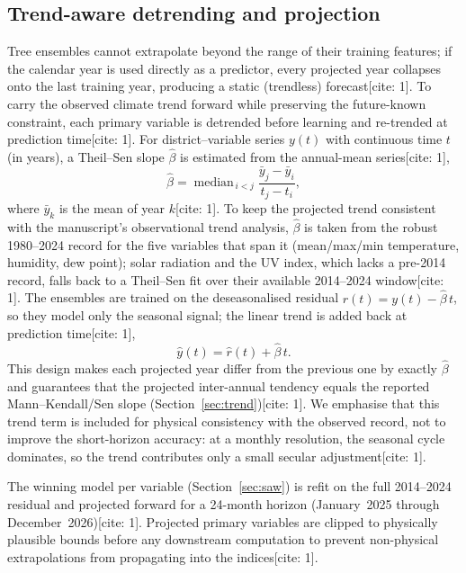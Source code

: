 \documentclass[pdflatex,sn-mathphys-ay]{sn-jnl}
\begin{document}
\subsection{Trend-aware detrending and projection}\label{sec:detrend}
Tree ensembles cannot extrapolate beyond the range of their training features; if the calendar year is used directly as a predictor, every projected year collapses onto the last training year, producing a static (trendless) forecast[cite: 1]. To carry the observed climate trend forward while preserving the future-known constraint, each primary variable is detrended before learning and re-trended at prediction time[cite: 1]. For district--variable series $y(t)$ with continuous time $t$ (in years), a Theil--Sen slope $\hat{\beta}$ is estimated from the annual-mean series[cite: 1],
\begin{equation}
\hat{\beta}=\operatorname{median}_{\,i<j}
\frac{\bar{y}_{j}-\bar{y}_{i}}{t_{j}-t_{i}},
\label{eq:theilsen}
\end{equation}
where $\bar{y}_{k}$ is the mean of year $k$[cite: 1]. To keep the projected trend consistent with the manuscript's observational trend analysis, $\hat{\beta}$ is taken from the robust 1980--2024 record for the five variables that span it (mean/max/min temperature, humidity, dew point); solar radiation and the UV index, which lacks a pre-2014 record, falls back to a Theil--Sen fit over their available 2014--2024 window[cite: 1]. The ensembles are trained on the deseasonalised residual $r(t)=y(t)-\hat{\beta}\,t$, so they model only the seasonal signal; the linear trend is added back at prediction time[cite: 1],
\begin{equation}
\hat{y}(t)=\hat{r}(t)+\hat{\beta}\,t.
\end{equation}
This design makes each projected year differ from the previous one by exactly $\hat{\beta}$ and guarantees that the projected inter-annual tendency equals the reported Mann--Kendall/Sen slope (Section~\ref{sec:trend})[cite: 1]. We emphasise that this trend term is included for physical consistency with the observed record, not to improve the short-horizon accuracy: at a monthly resolution, the seasonal cycle dominates, so the trend contributes only a small secular adjustment[cite: 1].

The winning model per variable (Section~\ref{sec:saw}) is refit on the full 2014--2024 residual and projected forward for a 24-month horizon (January~2025 through December~2026)[cite: 1]. Projected primary variables are clipped to physically plausible bounds before any downstream computation to prevent non-physical extrapolations from propagating into the indices[cite: 1].
\end{document}

